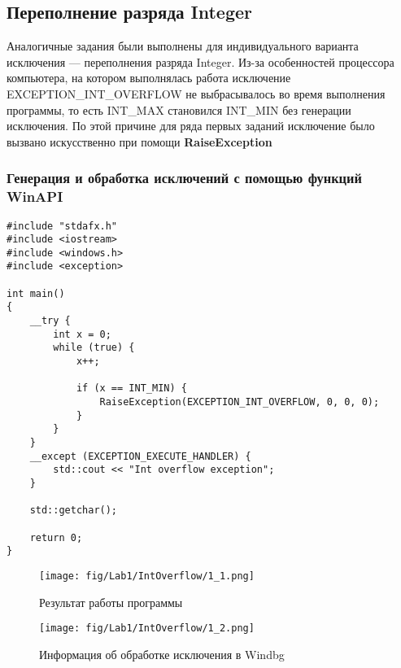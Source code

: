 \subsection{Переполнение разряда Integer}
Аналогичные задания были выполнены для индивидуального варианта исключения — переполнения разряда Integer. Из-за особенностей \cite{b2, b3} процессора компьютера, на котором выполнялась работа исключение EXCEPTION\_INT\_OVERFLOW не выбрасывалось во время выполнения программы, то есть INT\_MAX становился INT\_MIN без генерации исключения. По этой причине для ряда первых заданий исключение было вызвано искусственно при помощи \textbf{RaiseException}

\subsubsection{Генерация и обработка исключений с помощью функций WinAPI}

\begin{lstlisting}[caption=Генерация и обработка исключения]
#include "stdafx.h"
#include <iostream>
#include <windows.h>
#include <exception>

int main()
{
    __try {
        int x = 0;
        while (true) {
            x++;

            if (x == INT_MIN) {
                RaiseException(EXCEPTION_INT_OVERFLOW, 0, 0, 0);
            }
        }
    }
    __except (EXCEPTION_EXECUTE_HANDLER) {
        std::cout << "Int overflow exception";
    }

    std::getchar();

    return 0;
}
\end{lstlisting}

\begin{figure}[H]
    \begin{center}
        \texttt{[image: fig/Lab1/IntOverflow/1\_1.png]}
        \caption{Результат работы программы}
        \label{pic:1_1}
    \end{center}
\end{figure}

\begin{figure}[H]
    \begin{center}
        \texttt{[image: fig/Lab1/IntOverflow/1\_2.png]}
        \caption{Информация об обработке исключения в Windbg}
        \label{pic:1_2}
    \end{center}
\end{figure}

